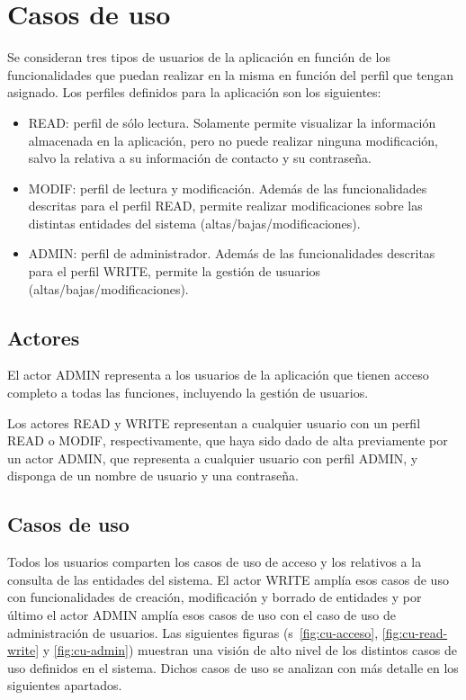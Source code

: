 \section{Casos de uso}
\label{sec:casos de uso}

Se consideran tres tipos de usuarios de la aplicación en función de los funcionalidades que puedan realizar en la misma en función del perfil que tengan asignado. Los perfiles definidos para la aplicación son los siguientes:
\begin{itemize}
\item READ: perfil de sólo lectura. Solamente permite visualizar la información almacenada en la aplicación, pero no puede realizar ninguna modificación, salvo la relativa a su información de contacto y su contraseña.
\item MODIF: perfil de lectura y modificación. Además de las funcionalidades descritas para el perfil READ, permite realizar modificaciones sobre las distintas entidades del sistema (altas/bajas/modificaciones).
\item ADMIN: perfil de administrador. Además de las funcionalidades descritas para el perfil WRITE, permite la gestión de usuarios (altas/bajas/modificaciones).
\end{itemize}


\subsection{Actores}
\label{sub:actores_analisis}

El actor ADMIN representa a los usuarios de la aplicación que tienen
acceso completo a todas las funciones, incluyendo la gestión de usuarios.

Los actores  READ y  WRITE representan a cualquier usuario con un perfil READ o MODIF, respectivamente, que haya sido dado de alta previamente por un actor ADMIN, que representa a cualquier usuario con perfil ADMIN, y disponga de un nombre de usuario y una contraseña.


\subsection{Casos de uso}
\label{sub:casos-uso}


Todos los usuarios comparten los casos de uso de acceso y los relativos a la consulta de las entidades del sistema. El actor WRITE amplía esos casos de uso con funcionalidades de creación, modificación y borrado de entidades y por último el actor ADMIN amplía esos casos de uso con el caso de uso de administración de usuarios. Las siguientes figuras (\figurename{}s~\ref{fig:cu-acceso}, \ref{fig:cu-read-write} y \ref{fig:cu-admin}) muestran una visión de alto nivel de los distintos casos de uso definidos en el sistema. Dichos casos de uso se analizan con más detalle en los siguientes apartados.


